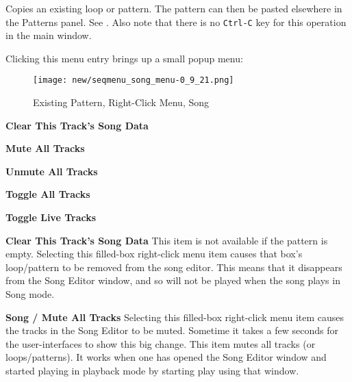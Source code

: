 %

   Copies an existing loop or pattern.
   The pattern can then be pasted elsewhere in the Patterns panel.
   See .
   Also note that there is no \texttt{Ctrl-C} key for this operation in the
   main window.

   Clicking this menu entry brings up a small popup menu:

\begin{figure}[H]
   \centering 
   \texttt{[image: new/seqmenu\_song\_menu-0\_9\_21.png]}
   \caption{Existing Pattern, Right-Click Menu, Song}
   \label{fig:pattern_window_right_click_song}
\end{figure}

   \begin{enumber}
      \item \textbf{Clear This Track's Song Data}
      \item \textbf{Mute All Tracks}
      \item \textbf{Unmute All Tracks}
      \item \textbf{Toggle All Tracks}
      \item \textbf{Toggle Live Tracks}
   \end{enumber}


   \textbf{Clear This Track's Song Data}
   This item is not available if the pattern is empty.
   Selecting this filled-box right-click menu item causes that box's
   loop/pattern to be removed from the song editor.  This means
   that it disappears from the Song Editor window, and so will not
   be played when the song plays in Song mode.

   \textbf{Song / Mute All Tracks}
   Selecting this filled-box right-click menu item causes
   the tracks in the Song Editor to be muted.  Sometime it takes a few seconds
   for the user-interfaces to show this big change.
   This item mutes all tracks (or loops/patterns).
   It works when one has opened the Song Editor window
   and started playing in playback
   mode by starting play using that window.

